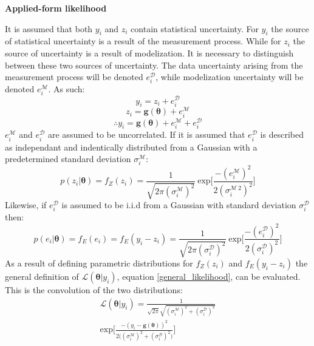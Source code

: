 \begin{tcolorbox}[enhanced jigsaw,breakable,pad at break*=1mm,title=Technical figure 2: Applied likelihood derivation, title filled,fonttitle=\sffamily\bfseries,fontupper=\sffamily\scriptsize]
\begin{multicols}{2}
\textbf{Applied-form likelihood}

It is assumed that both $y_i$ and $z_i$ contain statistical uncertainty. For $y_i$ the source of statistical uncertainty is a result of the measurement process. While for $z_i$ the source of uncertainty is a result of modelization. It is necessary to distinguish between these two sources of uncertainty. The data uncertainty arising from the measurement process will be denoted $e^{\mathcal{D}}_i$, while modelization uncertainty will be denoted $e^{\mathcal{M}}_i$. As such:
\begin{equation}
y_i = z_i + e^{\mathcal{D}}_i
\end{equation}
\begin{equation}
z_i = \bm{g}(\bm{\theta}) + e^{\mathcal{M}}_i
\end{equation}
\begin{equation}
\therefore y_i = \bm{g}(\bm{\theta}) + e^{\mathcal{M}}_i + e^{\mathcal{D}}_i
\end{equation}
$e^{\mathcal{M}}_i$ and $e^{\mathcal{D}}_i$ are assumed to be uncorrelated. If it is assumed that $e^{\mathcal{D}}_i$ is described as independant and indentically distributed from a Gaussian with a predetermined standard deviation $\sigma^{\mathcal{M}}_i$: 
\begin{equation}
p(z_i|\bm{\theta}) = f_Z(z_i) = \frac{1}{\sqrt{2\pi(\sigma^{\mathcal{M}}_i)^2}}\ \text{exp}\bigg[\frac{-(e^{\mathcal{M}}_i)^2}{2(\sigma^{\mathcal{M}\ 2}_i)^2} \bigg]
\end{equation} 
Likewise, if $e^{\mathcal{D}}_i$ is assumed to be i.i.d from a Gaussian with standard deviation $\sigma^{\mathcal{D}}_i$ then:
\begin{equation}
p(e_i|\bm{\theta}) = f_E(e_i) = f_E(y_i-z_i) = \frac{1}{\sqrt{2\pi(\sigma^{\mathcal{D}}_i)^2}}\ \text{exp}\bigg[\frac{-(e^{\mathcal{D}}_i)^2}{2(\sigma^{\mathcal{D}}_i)^2} \bigg]
\end{equation}
As a result of defining parametric distributions for $f_Z(z_i)$ and $f_E(y_i-z_i)$ the general definition of $\mathcal{L}(\bm{\theta}|y_i)$, equation \ref{general_likelihood}, can be evaluated. This is the convolution of the two distributions: 
\begin{equation}
\begin{split}
\mathcal{L}(\bm{\theta}|y_i) = \frac{1}{\sqrt{2\pi}\sqrt{(\sigma^{\mathcal{M}}_i)^2+(\sigma^{\mathcal{D}}_i)^2}}\\
\text{exp}\bigg[\frac{-(y_i-\bm{g}(\bm{\theta}))^2}{2\big((\sigma^{\mathcal{M}}_i)^2+(\sigma^{\mathcal{D}}_i)^2\big)}\bigg]
\end{split}
\label{single-data-likelihood}
\end{equation}\\


\end{multicols}
\end{tcolorbox}
